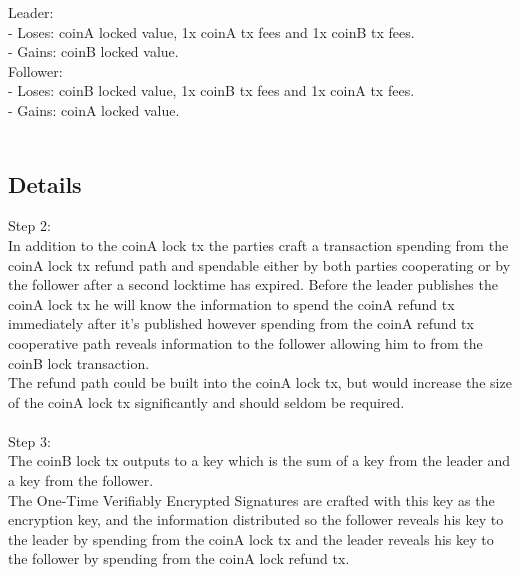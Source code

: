\documentclass[a4paper]{article}
\begin{document}
\noindent Leader:\\
 - Loses: coinA locked value, 1x coinA tx fees and 1x coinB tx fees.\\
 - Gains: coinB locked value.\\
Follower:\\
 - Loses: coinB locked value, 1x coinB tx fees and 1x coinA tx fees.\\
 - Gains: coinA locked value.\\
\\

\subsection{Details}

Step 2:\\
In addition to the coinA lock tx the parties craft a transaction
spending from the coinA lock tx refund path and spendable either by
both parties cooperating or by the follower after a second locktime has
expired.  Before the leader publishes the coinA lock tx he will know the
information to spend the coinA refund tx immediately after it's published
however spending from the coinA refund tx cooperative path reveals
information to the follower allowing him to from the coinB lock
transaction.\\
The refund path could be built into the coinA lock tx, but would
increase the size of the coinA lock tx significantly and should seldom
be required.\\
\\
Step 3:\\
The coinB lock tx outputs to a key which is the sum of a key from the
leader and a key from the follower.\\
The One-Time Verifiably Encrypted Signatures are crafted with this key
as the encryption key, and the information distributed so the
follower reveals his key to the leader by spending from the coinA lock
tx and the leader reveals his key to the follower by spending from the
coinA lock refund tx.\\
\\
\\
\end{document}
